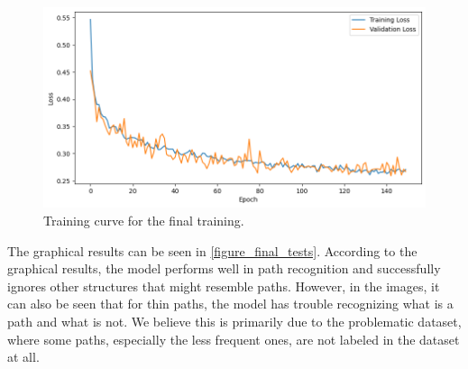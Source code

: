 \documentclass[12pt]{article}
\begin{document}
\begin{figure}[h]
    \centering
    \includegraphics[width=1\linewidth]{final test training curve.png}
    \caption{Training curve for the final training.}
    \label{fig_final_loss}
\end{figure}

The graphical results can be seen in \ref{figure_final_tests}. According to the graphical results, the model performs well in path recognition and successfully ignores other structures that might resemble paths. However, in the images, it can also be seen that for thin paths, the model has trouble recognizing what is a path and what is not. We believe this is primarily due to the problematic dataset, where some paths, especially the less frequent ones, are not labeled in the dataset at all. 
\end{document}
